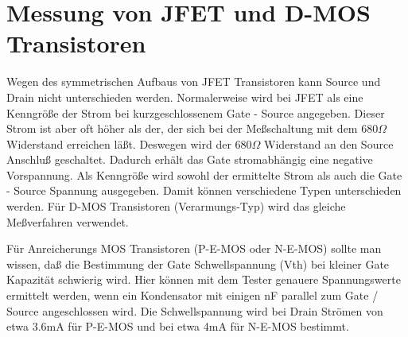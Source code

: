 \section{Messung von JFET und D-MOS Transistoren}
Wegen des symmetrischen Aufbaus von JFET Transistoren kann Source und Drain nicht unterschieden werden.
Normalerweise wird bei JFET als eine Kenngröße der Strom bei kurzgeschlossenem Gate - Source angegeben.
Dieser Strom ist aber oft höher als der, der sich bei der Meßschaltung mit dem \(680 \Omega\) Widerstand erreichen läßt.
Deswegen wird der \(680 \Omega\) Widerstand an den Source Anschluß geschaltet. Dadurch erhält das Gate
stromabhängig eine negative Vorspannung. Als Kenngröße wird sowohl der ermittelte Strom als auch die
Gate - Source Spannung ausgegeben. 
Damit können verschiedene Typen unterschieden werden.
Für D-MOS Transistoren (Verarmungs-Typ) wird das gleiche Meßverfahren verwendet.

Für Anreicherungs MOS Transistoren (P-E-MOS oder N-E-MOS) sollte man wissen, daß die Bestimmung der Gate Schwellspannung (Vth)
bei kleiner Gate  Kapazität schwierig wird. Hier können mit dem Tester genauere Spannungswerte ermittelt werden, wenn ein
Kondensator mit einigen nF parallel zum Gate / Source angeschlossen wird.
Die Schwellspannung wird bei Drain Strömen von etwa 3.6mA für P-E-MOS und bei etwa 4mA für N-E-MOS bestimmt.
